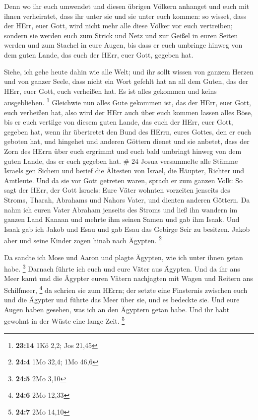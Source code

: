  Denn wo ihr euch umwendet und diesen übrigen Völkern
anhanget und euch mit ihnen verheiratet, dass ihr unter sie und sie
unter euch kommen:  so wisset, dass der HErr, euer Gott,
wird nicht mehr alle diese Völker vor euch vertreiben; sondern sie
werden euch zum Strick und Netz und zur Geißel in euren Seiten werden
und zum Stachel in eure Augen, bis dass er euch umbringe hinweg von dem
guten Lande, das euch der HErr, euer Gott, gegeben hat.

 Siehe, ich gehe heute dahin wie alle Welt; und ihr sollt
wissen von ganzem Herzen und von ganzer Seele, dass nicht ein Wort
gefehlt hat an all dem Guten, das der HErr, euer Gott, euch verheißen
hat. Es ist alles gekommen und keins ausgeblieben. \footnote{\textbf{23:14}
  1Kö 2,2; Jos 21,45}  Gleichwie nun alles Gute gekommen
ist, das der HErr, euer Gott, euch verheißen hat, also wird der HErr
auch über euch kommen lassen alles Böse, bis er euch vertilge von diesem
guten Lande, das euch der HErr, euer Gott, gegeben hat, 
wenn ihr übertretet den Bund des HErrn, eures Gottes, den er euch
geboten hat, und hingehet und anderen Göttern dienet und sie anbetet,
dass der Zorn des HErrn über euch ergrimmt und euch bald umbringt hinweg
von dem guten Lande, das er euch gegeben hat. \# 24  Josua
versammelte alle Stämme Israels gen Sichem und berief die Ältesten von
Israel, die Häupter, Richter und Amtleute. Und da sie vor Gott getreten
waren,  sprach er zum ganzen Volk: So sagt der HErr, der
Gott Israels: Eure Väter wohnten vorzeiten jenseits des Stroms, Tharah,
Abrahams und Nahors Vater, und dienten anderen Göttern.  Da
nahm ich euren Vater Abraham jenseits des Stroms und ließ ihn wandern im
ganzen Land Kanaan und mehrte ihm seinen Samen und gab ihm Isaak.
 Und Isaak gab ich Jakob und Esau und gab Esau das Gebirge
Seir zu besitzen. Jakob aber und seine Kinder zogen hinab nach Ägypten.
\footnote{\textbf{24:4} 1Mo 32,4; 1Mo 46,6}

 Da sandte ich Mose und Aaron und plagte Ägypten, wie ich
unter ihnen getan habe. \footnote{\textbf{24:5} 2Mo 3,10} 
Darnach führte ich euch und eure Väter aus Ägypten. Und da ihr ans Meer
kamt und die Ägypter euren Vätern nachjagten mit Wagen und Reitern ans
Schilfmeer, \footnote{\textbf{24:6} 2Mo 12,33}  da schrien
sie zum HErrn; der setzte eine Finsternis zwischen euch und die Ägypter
und führte das Meer über sie, und es bedeckte sie. Und eure Augen haben
gesehen, was ich an den Ägyptern getan habe. Und ihr habt gewohnt in der
Wüste eine lange Zeit. \footnote{\textbf{24:7} 2Mo 14,10}

